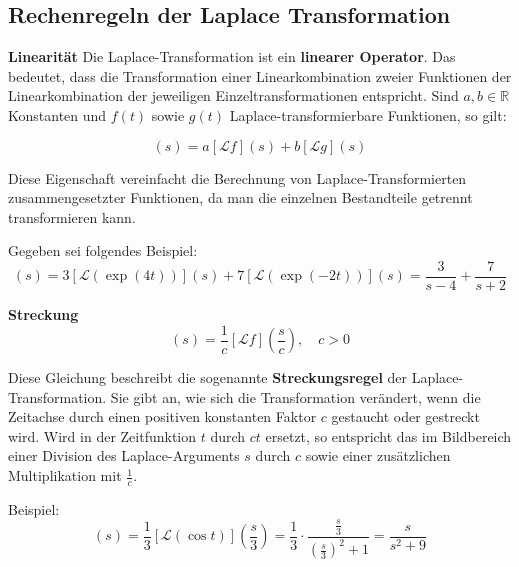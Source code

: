 \addvspace{1cm}
\subsection{Rechenregeln der Laplace Transformation}

\textbf{Linearität}
Die Laplace-Transformation ist ein \textbf{linearer Operator}. Das bedeutet, dass die Transformation einer Linearkombination zweier Funktionen der Linearkombination der jeweiligen Einzeltransformationen entspricht. Sind $a, b \in \mathbb{R}$ Konstanten und $f(t)$ sowie $g(t)$ Laplace-transformierbare Funktionen, so gilt:

\begin{equation}
[\mathcal{L}(a f(t) + b g(t))](s) = a [\mathcal{L}f](s) + b [\mathcal{L}g](s)
\label{eq:laplace_linearitaet}
\end{equation}


Diese Eigenschaft vereinfacht die Berechnung von Laplace-Transformierten zusammengesetzter Funktionen, da man die einzelnen Bestandteile getrennt transformieren kann.

Gegeben sei folgendes Beispiel:
\begin{equation}
    [\mathcal{L}(3\exp(4t) + 7\exp(-2t))](s)
    = 3[\mathcal{L}(\exp(4t))](s) + 7[\mathcal{L}(\exp(-2t))](s)
    = \frac{3}{s - 4} + \frac{7}{s + 2}
    \label{eq:laplace_bsp_linear}
    \end{equation}
    \cite[S.~883]{buch1}
    
\addvspace{1cm}
\textbf{Streckung}
\begin{equation}
    [\mathcal{L}(f(ct))](s) = \frac{1}{c}[\mathcal{L}f]\left(\frac{s}{c}\right), \quad c > 0
    \label{eq:laplace_streckung}
    \end{equation}

Diese Gleichung beschreibt die sogenannte \textbf{Streckungsregel} der Laplace-Transformation. Sie gibt an, wie sich die Transformation verändert, wenn die Zeitachse durch einen positiven konstanten Faktor $c$ gestaucht oder gestreckt wird. Wird in der Zeitfunktion $t$ durch $ct$ ersetzt, so entspricht das im Bildbereich einer Division des Laplace-Arguments $s$ durch $c$ sowie einer zusätzlichen Multiplikation mit $\frac{1}{c}$.

Beispiel:
\begin{equation}
    [\mathcal{L}(\cos(3t))](s) = \frac{1}{3}[\mathcal{L}(\cos t)]\left(\frac{s}{3}\right)
    = \frac{1}{3} \cdot \frac{\frac{s}{3}}{\left(\frac{s}{3}\right)^2 + 1}
    = \frac{s}{s^2 + 9}
    \label{eq:laplace_bsp_streckung}
    \end{equation}
    \cite[S.~884]{buch1}

